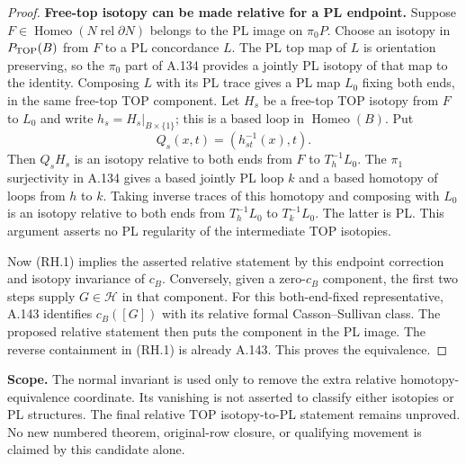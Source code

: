 \begin{proof}
\textbf{Free-top isotopy can be made relative for a PL endpoint.}\quad
Suppose $F\in\operatorname{Homeo}(N\operatorname{ rel}\partial N)$
belongs to the PL image on $\pi_0P$. Choose an isotopy in
$P_{\rm TOP}(B)$ from $F$ to a PL concordance $L$.
The PL top map of $L$ is orientation preserving, so the
$\pi_0$ part of A.134 provides a jointly PL isotopy of that map
to the identity. Composing $L$ with its PL trace gives a PL map
$L_0$ fixing both ends, in the same free-top TOP component.
Let $H_s$ be a free-top TOP isotopy from $F$ to $L_0$ and write
$h_s=H_s|_{B\times\{1\}}$; this is a based loop in
$\operatorname{Homeo}(B)$. Put
\[
 Q_s(x,t)=(h_{st}^{-1}(x),t).
\]
Then $Q_sH_s$ is an isotopy relative to both ends from $F$ to
$T_h^{-1}L_0$. The $\pi_1$ surjectivity in A.134 gives a based
jointly PL loop $k$ and a based homotopy of loops from $h$ to $k$.
Taking inverse traces of this homotopy and composing with $L_0$
is an isotopy relative to both ends from $T_h^{-1}L_0$ to
$T_k^{-1}L_0$. The latter is PL. This argument asserts no PL
regularity of the intermediate TOP isotopies.

Now (RH.1) implies the asserted relative statement by this
endpoint correction and isotopy invariance of $c_B$. Conversely,
given a zero-$c_B$ component, the first two steps supply
$G\in\mathcal H$ in that component. For this both-end-fixed
representative, A.143 identifies $c_B([G])$ with its relative
formal Casson--Sullivan class. The proposed relative statement
then puts the component in the PL image. The reverse containment
in (RH.1) is already A.143. This proves the equivalence.
\end{proof}

\textbf{Scope.}\quad
The normal invariant is used only to remove the extra relative
homotopy-equivalence coordinate. Its vanishing is not asserted
to classify either isotopies or PL structures. The final
relative TOP isotopy-to-PL statement remains unproved. No new
numbered theorem, original-row closure, or qualifying movement
is claimed by this candidate alone.
